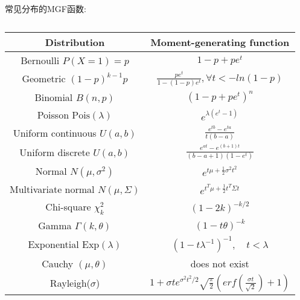 \documentclass[fontset=none,oneside]{book}
\begin{document}
常见分布的MGF函数:
\begin{table}[htbp]
\centering
\begin{tabular}{|c|c|}
\hline Distribution & Moment-generating function \\
\hline Bernoulli $P(X=1)=p$ & $1-p+pe^{t}$ \\
\hline Geometric $(1-p)^{k-1}p$ & $\frac{pe^{t}}{1-(1-p)e^{t}},\forall
                                  t < -ln(1-p)$ \\
\hline Binomial $B(n,p)$ & $(1-p+pe^{t})^{n}$ \\
\hline Poisson $\mathrm{Pois}(\lambda)$ & $e^{\lambda(e^{t}-1)}$ \\
\hline Uniform continuous $U(a,b)$ & $\frac{e^{tb}-e^{ta}}{t(b-a)}$ \\
\hline Uniform discrete $U(a,b)$ &
                                   $\frac{e^{at}-e^{(b+1)t}}{(b-a+1)(1-e^{t})}$
  \\
\hline Normal $N(\mu,\sigma^{2})$ &
                                    $e^{t\mu+\frac{1}{2}\sigma^{2}t^{2}}$
  \\
\hline Multivariate normal $N(\mu,\Sigma)$ &
                                             $e^{t^{T}\mu+\frac{1}{2}t^{T}\Sigma
                                             t}$ \\
\hline Chi-square $\chi_{k}^{2}$ & $(1-2k)^{-k/2}$ \\
\hline Gamma $\Gamma(k,\theta)$ & $(1-t\theta)^{-k}$ \\
\hline Exponential $\mathrm{Exp}(\lambda)$ & $(1-t\lambda^{-1})^{-1},\quad
                                    t<\lambda$ \\
\hline Cauchy $(\mu,\theta)$ & does not exist \\
\hline Rayleigh($\sigma$) & $1+\sigma
                            te^{\sigma^{2}t^{2}/2}\sqrt{\frac{\pi}{2}}(erf(\frac{\sigma
                            t}{\sqrt{2}})+1)$ \\
\hline
\end{tabular}
\caption{\label{tab:mgf}}
\end{table}

 
\end{document}
